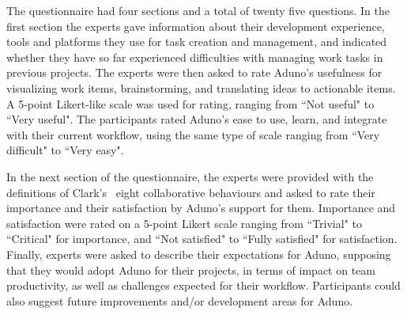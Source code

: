 \documentclass[conference]{IEEEtran}
\newcommand{\cmark}{\ding{51}}%
\begin{document}
%

The questionnaire had four sections and a total of twenty five questions. In the first section the experts gave information about their development experience, tools and platforms they use for task creation and management, and indicated whether they have so far experienced difficulties with managing work tasks in previous projects. The experts were then asked to rate Aduno's usefulness for visualizing work items, brainstorming, and translating ideas to actionable items. A 5-point Likert-like scale was used for rating, ranging from ``Not useful" to ``Very useful". The participants rated Aduno's ease to use, learn, and integrate with their current workflow, using the same type of scale ranging from ``Very difficult" to ``Very easy".

In the next section of the questionnaire, the experts were provided with the definitions of Clark's~\cite{Clark96} eight collaborative behaviours and asked to rate their importance and their satisfaction by Aduno's support for them. Importance and satisfaction were rated on a 5-point Likert scale ranging from ``Trivial" to ``Critical" for importance, and ``Not satisfied" to ``Fully satisfied" for satisfaction. Finally, experts were asked to describe their expectations for Aduno, supposing that they would adopt Aduno for their projects, in terms of impact on team productivity, as well as challenges expected for their workflow. Participants could also suggest future improvements and/or development areas for Aduno.
\end{document}
